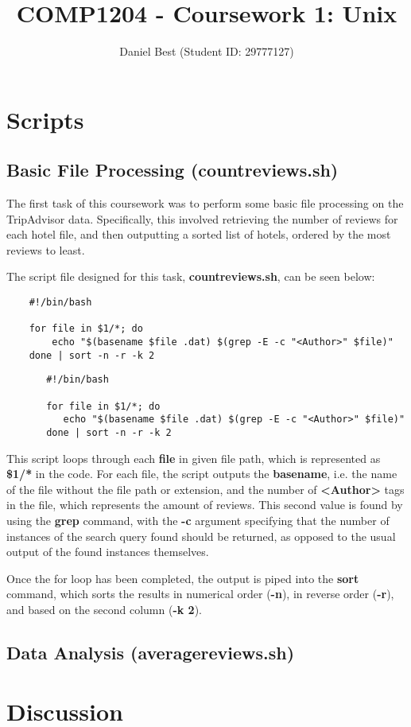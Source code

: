 \documentclass{article}
\title{COMP1204 - Coursework 1: Unix}
\author{Daniel Best (Student ID: 29777127)}
\begin{document}
	
	\maketitle
	
	\newpage
	\section{Scripts}
	
	\subsection{Basic File Processing (countreviews.sh)}
	The first task of this coursework was to perform some basic file processing on the TripAdvisor data. Specifically, this involved retrieving the number of reviews for each hotel file, and then outputting a sorted list of hotels, ordered by the most reviews to least. \newline
	
	\noindent
	The script file designed for this task, \textbf{countreviews.sh}, can be seen below:
	
	\begin{lstlisting}
	#!/bin/bash
		
	for file in $1/*; do	
		echo "$(basename $file .dat) $(grep -E -c "<Author>" $file)"
	done | sort -n -r -k 2
	\end{lstlisting}
	
	\begin{verbatim}
	   #!/bin/bash
	
	   for file in $1/*; do	
	      echo "$(basename $file .dat) $(grep -E -c "<Author>" $file)"
	   done | sort -n -r -k 2
	\end{verbatim}

	\noindent
	This script loops through each \textbf{file} in given file path, which is represented as \textbf{\$1/*} in the code. For each file, the script outputs the \textbf{basename}, i.e. the name of the file without the file path or extension, and the number of \textbf{{\textless}Author\textgreater} tags in the file, which represents the amount of reviews. This second value is found by using the \textbf{grep} command, with the \textbf{-c} argument specifying that the number of instances of the search query found should be returned, as opposed to the usual output of the found instances themselves. \newline
	
	\noindent
	Once the for loop has been completed, the output is piped into the \textbf{sort} command, which sorts the results in numerical order (\textbf{-n}), in reverse order (\textbf{-r}), and based on the second column (\textbf{-k 2}).
	
	\subsection{Data Analysis (averagereviews.sh)}
	
	\section{Discussion}
	
\end{document}
